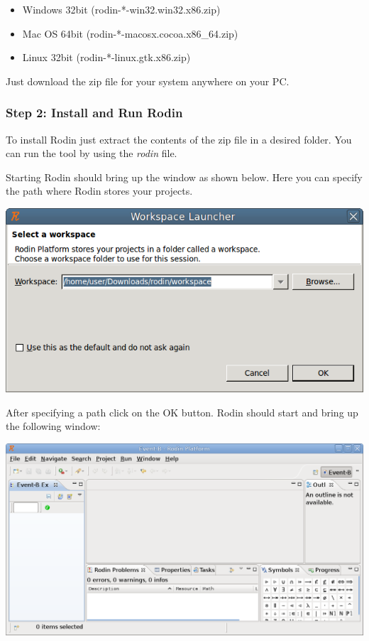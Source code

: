 \begin{itemize}
	\item Windows 32bit (rodin-*-win32.win32.x86.zip)
	\item Mac OS 64bit (rodin-*-macosx.cocoa.x86\_64.zip)
	\item Linux 32bit (rodin-*-linux.gtk.x86.zip)
\end{itemize}

Just download the zip file for your system anywhere on your PC.


\subsubsection{Step 2: Install and Run Rodin}

To install Rodin just extract the contents of the zip file in a desired folder. You can run the tool by using the \textit{rodin} file.

Starting Rodin should bring up the window as shown below. Here you can specify the path where Rodin stores your projects.

\begin{center}
	\includegraphics{img/tutorial/install2.png}
\end{center}

After specifying a path click on the \textsf{OK} button. Rodin should start and bring up the following window:

\begin{center}
	\includegraphics{img/tutorial/install3.png}
\end{center}

